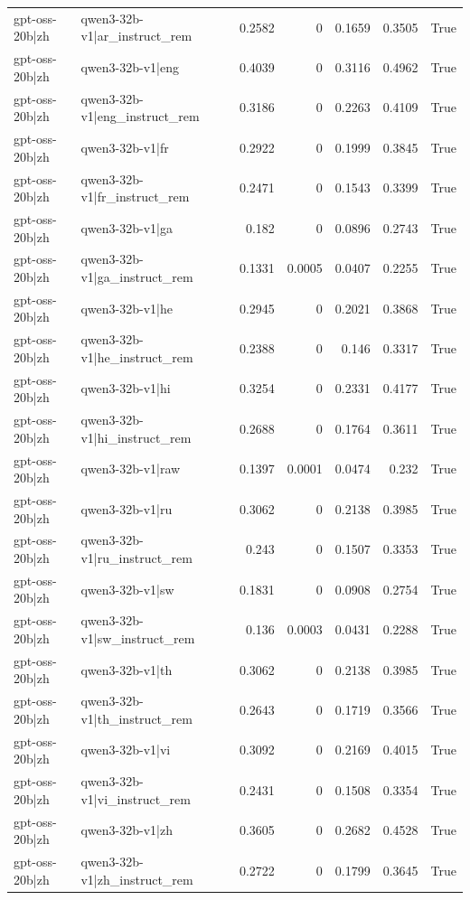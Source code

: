 \begin{table}
\begin{tabular}{l l r r r r l}
gpt-oss-20b|zh & qwen3-32b-v1|ar_instruct_rem & 0.2582 & 0 & 0.1659 & 0.3505 & True \\
gpt-oss-20b|zh & qwen3-32b-v1|eng & 0.4039 & 0 & 0.3116 & 0.4962 & True \\
gpt-oss-20b|zh & qwen3-32b-v1|eng_instruct_rem & 0.3186 & 0 & 0.2263 & 0.4109 & True \\
gpt-oss-20b|zh & qwen3-32b-v1|fr & 0.2922 & 0 & 0.1999 & 0.3845 & True \\
gpt-oss-20b|zh & qwen3-32b-v1|fr_instruct_rem & 0.2471 & 0 & 0.1543 & 0.3399 & True \\
gpt-oss-20b|zh & qwen3-32b-v1|ga & 0.182 & 0 & 0.0896 & 0.2743 & True \\
gpt-oss-20b|zh & qwen3-32b-v1|ga_instruct_rem & 0.1331 & 0.0005 & 0.0407 & 0.2255 & True \\
gpt-oss-20b|zh & qwen3-32b-v1|he & 0.2945 & 0 & 0.2021 & 0.3868 & True \\
gpt-oss-20b|zh & qwen3-32b-v1|he_instruct_rem & 0.2388 & 0 & 0.146 & 0.3317 & True \\
gpt-oss-20b|zh & qwen3-32b-v1|hi & 0.3254 & 0 & 0.2331 & 0.4177 & True \\
gpt-oss-20b|zh & qwen3-32b-v1|hi_instruct_rem & 0.2688 & 0 & 0.1764 & 0.3611 & True \\
gpt-oss-20b|zh & qwen3-32b-v1|raw & 0.1397 & 0.0001 & 0.0474 & 0.232 & True \\
gpt-oss-20b|zh & qwen3-32b-v1|ru & 0.3062 & 0 & 0.2138 & 0.3985 & True \\
gpt-oss-20b|zh & qwen3-32b-v1|ru_instruct_rem & 0.243 & 0 & 0.1507 & 0.3353 & True \\
gpt-oss-20b|zh & qwen3-32b-v1|sw & 0.1831 & 0 & 0.0908 & 0.2754 & True \\
gpt-oss-20b|zh & qwen3-32b-v1|sw_instruct_rem & 0.136 & 0.0003 & 0.0431 & 0.2288 & True \\
gpt-oss-20b|zh & qwen3-32b-v1|th & 0.3062 & 0 & 0.2138 & 0.3985 & True \\
gpt-oss-20b|zh & qwen3-32b-v1|th_instruct_rem & 0.2643 & 0 & 0.1719 & 0.3566 & True \\
gpt-oss-20b|zh & qwen3-32b-v1|vi & 0.3092 & 0 & 0.2169 & 0.4015 & True \\
gpt-oss-20b|zh & qwen3-32b-v1|vi_instruct_rem & 0.2431 & 0 & 0.1508 & 0.3354 & True \\
gpt-oss-20b|zh & qwen3-32b-v1|zh & 0.3605 & 0 & 0.2682 & 0.4528 & True \\
gpt-oss-20b|zh & qwen3-32b-v1|zh_instruct_rem & 0.2722 & 0 & 0.1799 & 0.3645 & True \\

\end{tabular}
\end{table}
